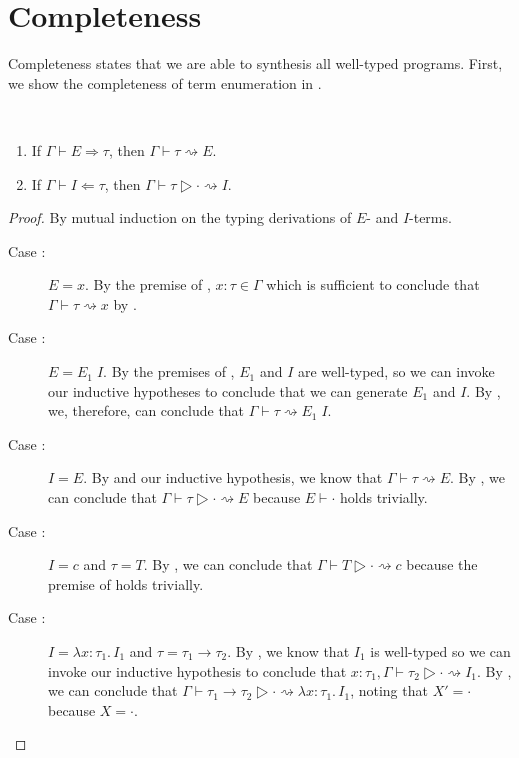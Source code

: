 \section{Completeness}

Completeness states that we are able to synthesis all well-typed programs.
First, we show the completeness of term enumeration in \lsyn{}.
\begin{lemma}\ %
\label{lem:completeness-of-lsyn-term-enumeration}
  \begin{enumerate}
    \item If $Γ ⊢ E ⇒ τ$, then $Γ ⊢ τ ⇝ E$.
    \item If $Γ ⊢ I ⇐ τ$, then $Γ ⊢ τ ▷ · ⇝ I$.
  \end{enumerate}
\end{lemma}
\begin{proof}
  By mutual induction on the typing derivations of $E$- and $I$-terms.
  \begin{description}
    \item[Case :]
      $E = x$.
      By the premise of , $x{:}τ ∈ Γ$ which is sufficient to conclude that $Γ ⊢ τ ⇝ x$ by .
    \item[Case :]
      $E = E_1\;I$.
      By the premises of , $E_1$ and $I$ are well-typed, so we can invoke our inductive hypotheses to conclude that we can generate $E_1$ and $I$.
      By , we, therefore, can conclude that $Γ ⊢ τ ⇝ E_1\;I$.
    \item[Case :]
      $I = E$.
      By  and our inductive hypothesis, we know that $Γ ⊢ τ ⇝ E$.
      By , we can conclude that $Γ ⊢ τ ▷ · ⇝ E$ because $E ⊢ ·$ holds trivially.
    \item[Case :]
      $I = c$ and $τ = T$.
      By , we can conclude that $Γ ⊢ T ▷ · ⇝ c$ because the premise of  holds trivially.
    \item[Case :]
      $I = λx{:}τ_1.\,I_1$ and $τ = τ_1 → τ_2$.
      By , we know that $I_1$ is well-typed so we can invoke our inductive hypothesis to conclude that $x{:}τ_1, Γ ⊢ τ_2 ▷ · ⇝ I_1$.
      By , we can conclude that $Γ ⊢ τ_1 → τ_2 ▷ · ⇝ λx{:}τ_1.\,I_1$, noting that $Χ' = ·$ because $Χ = ·$.
  \end{description}
\end{proof}

